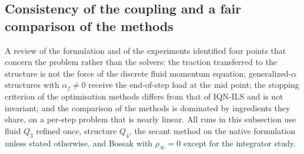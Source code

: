 \documentclass[11pt,a4paper]{article}
\theoremstyle{definition}
\theoremstyle{remark}
\begin{document}
\begin{table}[ht]\centering
\caption{FSI2 from rest to $t=15$~s, $2$ processes, same subproblem solvers: Dirichlet--Neumann
with IQN-ILS against the optimisation-based methods. Iterations: Dirichlet--Neumann iterations
(IQN-ILS) or state evaluations per step; deviation: maximal deviation of the tip displacement from
IQN-ILS with $\mathrm{RelTol}=10^{-7}$ of the same fluid solver, relative to its maximum. Implicit
geometry: same scheme as IQN-ILS.}
\label{tab:iqn_comparison}
\end{table}

\subsection{Consistency of the coupling and a fair comparison of the methods}\label{sec:consistency}

A review of the formulation and of the experiments identified four points that concern the problem
rather than the solvers: the traction transferred to the structure is not the force of the discrete
fluid momentum equation; generalized-$\alpha$ structures with $\alpha_f\neq0$ receive the
end-of-step load at the mid point; the stopping criterion of the optimisation methods differs from
that of IQN-ILS and is not invariant; and the comparison of the methods is dominated by ingredients
they share, on a per-step problem that is nearly linear. All runs in this subsection use fluid $Q_3$
refined once, structure $Q_4$, the secant method on the native formulation unless stated otherwise,
and Bossak with $\rho_\infty=0$ except for the integrator study.
\end{document}
